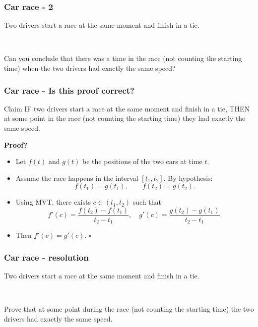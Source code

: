 \documentclass[14pt]{beamer}
\newcommand{\setsize}[1]{\fontsize{#1}{#1}\selectfont} %
\newcommand{\smallerfont}{\setsize{13}} %
\begin{document}
\begin{frame}[t]
\smallerfont
\frametitle{Car race - 2}

Two drivers start a race at the same moment and finish in a tie.

\

Can you conclude that there was a time in the race (not counting the starting time) when the two drivers had exactly the same speed?

\end{frame}
\begin{frame}[t]
\smallerfont
\frametitle{Car race - Is this proof correct?}

\begin{block}{\smallerfont Claim}
IF two drivers start a race at the same moment and finish in a tie, THEN at some point in the race (not counting the starting time) they had exactly the same speed.
\end{block}

{\bf Proof?}
	\begin{itemize}
		\item Let $f(t)$ and $g(t)$ be the positions of the two cars at time $t$.
		\item Assume the race happens in the interval $[t_1,t_2]$.   By hypothesis:
			$$ f(t_1) = g(t_1), \quad \quad f(t_2) = g(t_2). $$
		\item Using MVT, there exists $c \in (t_1, t_2)$ such that
			$$
				f'(c) = \frac{f(t_2) - f(t_1)}{t_2 - t_1}, \quad g'(c) = \frac{g(t_2) - g(t_1)}{t_2 - t_1}.
			$$	
		\item Then $f'(c) = g'(c)$. \hfill $\square$
	\end{itemize}

\end{frame}

\begin{frame}[t]
\smallerfont
\frametitle{Car race - resolution}

Two drivers start a race at the same moment and finish in a tie.

\

Prove that at some point during the race (not counting the starting time) the two drivers had exactly the same speed. 

\end{frame}
\end{document}

